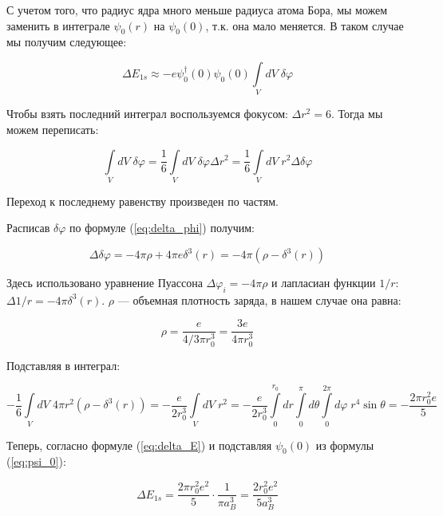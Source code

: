 \documentclass[a4paper, 12pt]{article}
\renewcommand{\phi}{\varphi} %
\begin{document}
С учетом того, что радиус ядра много меньше радиуса атома Бора, мы можем заменить в интеграле $\psi_0(r)$ на $\psi_0(0)$, т.к. она мало меняется. В таком случае мы получим следующее:

\begin{equation}
	\Delta E_{1s} \approx - e \psi_0^{\dagger}(0)\psi_0(0) \int \limits_V dV \; \delta \phi 
	\label{eq:delta_E}
\end{equation}

Чтобы взять последний интеграл воспользуемся фокусом: $\Delta r^2 = 6$. Тогда мы можем переписать:

\begin{equation*}
	\int\limits_V dV\; \delta \phi = \frac{1}{6} \int\limits_V dV \; \delta\phi \Delta r^2 = \frac{1}{6} \int\limits_V dV \; r^2 \Delta \delta\phi 
\end{equation*}

Переход к последнему равенству произведен по частям.

Расписав $\delta\phi$ по формуле (\ref{eq:delta_phi}) получим:

\begin{equation*}
	\Delta\delta \phi = -4\pi\rho + 4\pi e \delta^3(r) = -4\pi (\rho - \delta^3(r))
\end{equation*}

Здесь использовано уравнение Пуассона $\Delta \phi_i = -4\pi\rho$ и лапласиан функции $1/r$: \mbox{$\Delta 1/r = -4\pi\delta^3(r)$}. $\rho$ --- объемная плотность заряда, в нашем случае она равна:

\begin{equation*}
	\rho = \frac{e}{4/3 \pi r_0^3} = \frac{3e}{4\pi r_0^3}
\end{equation*}

Подставляя в интеграл:

\begin{equation*}
	-\frac{1}{6} \int\limits_V dV \; 4\pi r^2 (\rho - \delta^3(r)) = -\frac{e}{2r_0^3}\int\limits_V dV \; r^2 = -\frac{e}{2r_0^3} \int\limits_{0}^{r_0} dr \int\limits_{0}^{\pi} d\theta \int\limits_{0}^{2\pi} d\phi \; r^4 \sin\theta = - \frac{2\pi r_0^2 e}{5}
\end{equation*}

Теперь, согласно формуле (\ref{eq:delta_E}) и подставляя $\psi_0(0)$ из формулы (\ref{eq:psi_0}):

\begin{equation*}
	\Delta E_{1s} = \frac{2\pi r_0^2 e^2}{5} \cdot \frac{1}{\pi a_B^3} = \boxed{\frac{2r_0^2 e^2}{5 a_B^3}}
\end{equation*}
\end{document}
